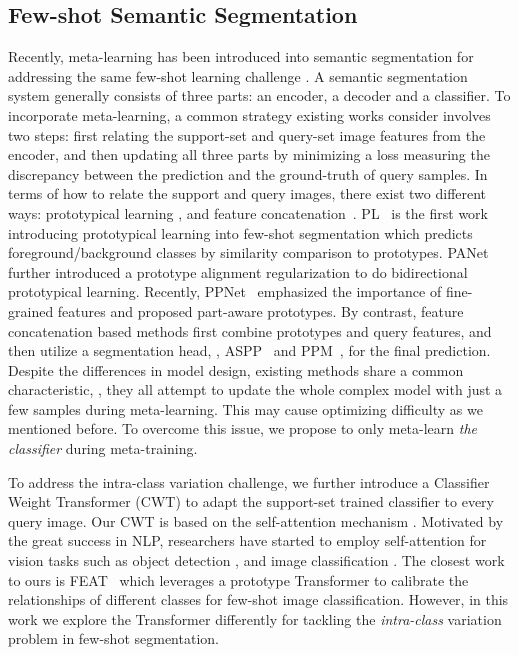 \documentclass[10pt,twocolumn,letterpaper]{article}
\begin{document}
\subsection{Few-shot Semantic Segmentation}
Recently, meta-learning has been introduced into semantic segmentation for addressing the same few-shot learning challenge \cite{shaban2017one}.
A semantic segmentation system generally consists of three parts: an encoder, a decoder and a classifier.
To incorporate meta-learning, 
a common strategy existing works consider involves two steps:
first relating the support-set and query-set image features from the encoder, and then updating all three parts by minimizing a loss measuring the discrepancy between the prediction and the ground-truth of query samples.
In terms of how to relate the support and query images,
there exist two different ways:
prototypical learning \cite{dong2018few, wang2019panet, liu2020part},
and feature concatenation~\cite{cao2020few, azad2021texture, zhang2019canet, yang2020prototype}.
PL~\cite{dong2018few} is the first work introducing prototypical learning into few-shot segmentation which predicts foreground/background classes by similarity comparison to prototypes. PANet~\cite{wang2019panet} further introduced a prototype alignment regularization to do bidirectional prototypical learning. 
Recently, PPNet~\cite{liu2020part} emphasized the importance of fine-grained features and proposed part-aware prototypes. 
By contrast, feature concatenation based methods first combine prototypes and query features, and then utilize a segmentation head, \eg,  ASPP~\cite{chen2017rethinking} and PPM~\cite{zhao2017pyramid}, for the final prediction. 
Despite the differences in model design, existing methods share a  common characteristic, \ie, they all attempt to update the whole complex model with just a few samples during meta-learning. 
This may cause optimizing difficulty as we mentioned before.
To overcome this issue, we propose to only meta-learn \textit{the classifier} during meta-training.





To address the intra-class variation challenge,
we further introduce a Classifier Weight Transformer (CWT)
to adapt the support-set trained classifier to every query image.
Our CWT is based on the self-attention mechanism \cite{vaswani2017attention}.
Motivated by the great success in NLP,
researchers have started to employ self-attention 
for vision tasks such as object detection \cite{hu2018relation,carion2020end}, and
image classification \cite{wu2020visual,dosovitskiy2020image}.
The closest work to ours is FEAT~\cite{ye2020few}
which leverages a prototype Transformer to calibrate 
the relationships of different classes 
for few-shot image classification.
However, in this work we explore the Transformer differently
for tackling the {\em intra-class} variation problem
in few-shot segmentation.
\end{document}
